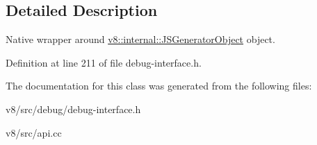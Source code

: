 \subsection{Detailed Description}
Native wrapper around \mbox{\hyperlink{classv8_1_1internal_1_1JSGeneratorObject}{v8\+::internal\+::\+J\+S\+Generator\+Object}} object. 

Definition at line 211 of file debug-\/interface.\+h.



The documentation for this class was generated from the following files\+:\begin{DoxyCompactItemize}
\item 
v8/src/debug/debug-\/interface.\+h\item 
v8/src/api.\+cc\end{DoxyCompactItemize}
